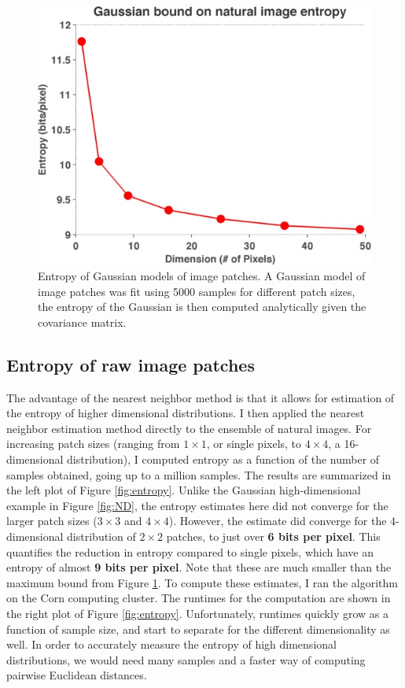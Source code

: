 \documentclass[10pt,twocolumn,letterpaper]{article}
\begin{document}
\begin{figure}
\begin{center}
   \includegraphics[width=1.0\linewidth]{maxent.jpg}
   \caption{Entropy of Gaussian models of image patches. A Gaussian model of image patches was fit using 5000 samples for different patch sizes, the entropy of the Gaussian is then computed analytically given the covariance matrix.}
\label{fig:gaussian}
\end{center}
\end{figure}

\subsection{Entropy of raw image patches}
The advantage of the nearest neighbor method is that it allows for estimation of the entropy of higher dimensional distributions.
I then applied the nearest neighbor estimation method directly to the ensemble of natural images. For increasing patch sizes (ranging from $1\times 1$, or single pixels, to $4\times 4$, a 16-dimensional distribution), I computed entropy as a function of the number of samples obtained, going up to a million samples. The results are summarized in the left plot of Figure \ref{fig:entropy}. Unlike the Gaussian high-dimensional example in Figure \ref{fig:ND}, the entropy estimates here did not converge for the larger patch sizes ($3\times 3$ and $4\times 4$). However, the estimate did converge for the 4-dimensional distribution of $2\times 2$ patches, to just over \textbf{6 bits per pixel}. This quantifies the reduction in entropy compared to single pixels, which have an entropy of almost \textbf{9 bits per pixel}. Note that these are much smaller than the maximum bound from Figure \ref{fig:gaussian}. To compute these estimates, I ran the algorithm on the Corn computing cluster. The runtimes for the computation are shown in the right plot of Figure \ref{fig:entropy}. Unfortunately, runtimes quickly grow as a function of sample size, and start to separate for the different dimensionality as well. In order to accurately measure the entropy of high dimensional distributions, we would need many samples and a faster way of computing pairwise Euclidean distances.
\end{document}
